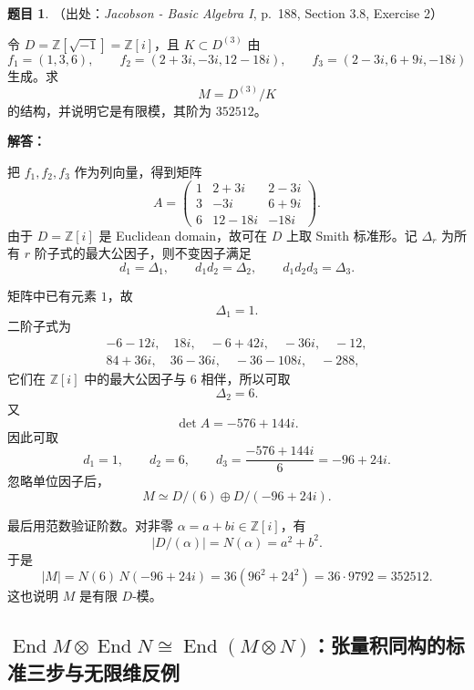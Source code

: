 \documentclass[a4paper]{ctexart}
\theoremstyle{definition}
\newtheorem{example}{题目}[section]
\theoremstyle{analysis}
\theoremstyle{plain}
\begin{document}
\begin{example}
（出处：\textit{Jacobson - Basic Algebra I}, p.~188, Section 3.8, Exercise 2）

令 \(D=\mathbb Z[\sqrt{-1}]=\mathbb Z[i]\)，且 \(K\subset D^{(3)}\) 由
\[
  f_1=(1,3,6),\qquad
  f_2=(2+3i,-3i,12-18i),\qquad
  f_3=(2-3i,6+9i,-18i)
\]
生成。求
\[
  M=D^{(3)}/K
\]
的结构，并说明它是有限模，其阶为 \(352512\)。

\textbf{解答：}

把 \(f_1,f_2,f_3\) 作为列向量，得到矩阵
\[
  A=
  \begin{pmatrix}
    1 & 2+3i & 2-3i\\
    3 & -3i & 6+9i\\
    6 & 12-18i & -18i
  \end{pmatrix}.
\]
由于 \(D=\mathbb Z[i]\) 是 Euclidean domain，故可在 \(D\) 上取 Smith 标准形。记
\(\Delta_r\) 为所有 \(r\) 阶子式的最大公因子，则不变因子满足
\[
  d_1=\Delta_1,\qquad
  d_1d_2=\Delta_2,\qquad
  d_1d_2d_3=\Delta_3.
\]

矩阵中已有元素 \(1\)，故
\[
  \Delta_1=1.
\]
二阶子式为
\[
\begin{gathered}
  -6-12i,\quad 18i,\quad -6+42i,\quad -36i,\quad -12,\\
  84+36i,\quad 36-36i,\quad -36-108i,\quad -288,
\end{gathered}
\]
它们在 \(\mathbb Z[i]\) 中的最大公因子与 \(6\) 相伴，所以可取
\[
  \Delta_2=6.
\]
又
\[
  \det A=-576+144i.
\]
因此可取
\[
  d_1=1,\qquad d_2=6,\qquad d_3=\frac{-576+144i}{6}=-96+24i.
\]
忽略单位因子后，
\[
  M\simeq D/(6)\oplus D/(-96+24i).
\]

最后用范数验证阶数。对非零 \(\alpha=a+bi\in \mathbb Z[i]\)，有
\[
  |D/(\alpha)|=N(\alpha)=a^2+b^2.
\]
于是
\[
  |M|
  =
  N(6)\,N(-96+24i)
  =
  36(96^2+24^2)
  =
  36\cdot 9792
  =
  352512.
\]
这也说明 \(M\) 是有限 \(D\)-模。
\end{example}

\subsection{\texorpdfstring{\(\operatorname{End}M\otimes\operatorname{End}N\cong\operatorname{End}(M\otimes N)\)：张量积同构的标准三步与无限维反例}{张量积自同态环的同构与无限维反例}}\label{subsec:problem-end-tensor-product}
\end{document}
